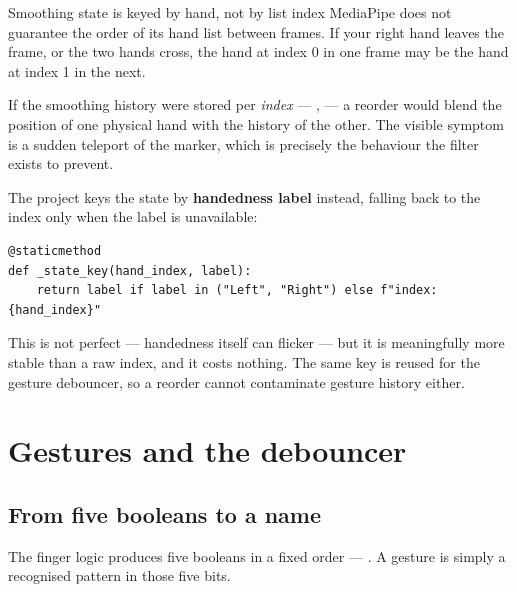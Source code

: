 \begin{edgetrap}{Smoothing state is keyed by hand, not by list index}
MediaPipe does not guarantee the order of its hand list between frames. If your right hand leaves the
frame, or the two hands cross, the hand at index 0 in one frame may be the hand at index 1 in the
next.

If the smoothing history were stored per \emph{index} --- ,
 --- a reorder would blend the position of one physical hand with the history
of the other. The visible symptom is a sudden teleport of the marker, which is precisely the
behaviour the filter exists to prevent.

The project keys the state by \textbf{handedness label} instead, falling back to the index only when
the label is unavailable:

\begin{lstlisting}
@staticmethod
def _state_key(hand_index, label):
    return label if label in ("Left", "Right") else f"index:{hand_index}"
\end{lstlisting}

This is not perfect --- handedness itself can flicker --- but it is meaningfully more stable than a
raw index, and it costs nothing. The same key is reused for the gesture debouncer, so a reorder
cannot contaminate gesture history either.
\end{edgetrap}

\section{Gestures and the debouncer}
\label{sec:gesture}

\subsection{From five booleans to a name}

The finger logic produces five booleans in a fixed order --- . A gesture is simply a recognised pattern in those five bits.

